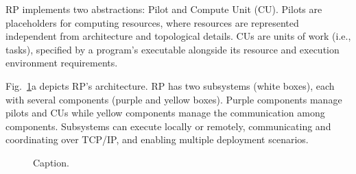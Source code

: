 \documentclass[preprint,12pt, a4paper]{elsarticle}
\begin{document}
RP implements two abstractions: Pilot and Compute Unit (CU). 
Pilots are placeholders for computing resources, where resources are
represented independent from architecture and topological details. CUs are
units of work (i.e., tasks), specified by a program's executable alongside
its resource and execution environment requirements.

Fig.~\ref{fig:archs}a depicts RP's architecture. RP has two subsystems (white
boxes), each with several components (purple and yellow boxes). 
Purple components manage pilots and CUs while yellow components manage the
communication among components. Subsystems can execute locally or remotely,
communicating and coordinating over TCP/IP, and enabling multiple deployment
scenarios. 

\begin{figure}
    \centering
    \qquad
    \caption{Caption. }\label{fig:archs}
\end{figure}
\end{document}
